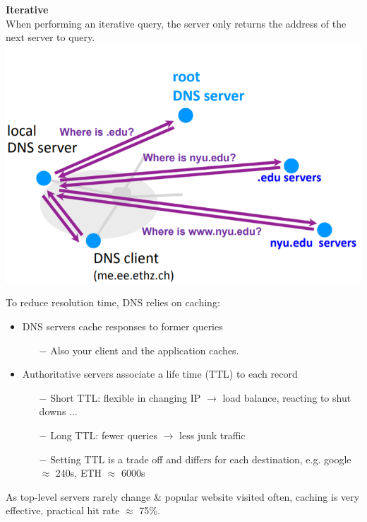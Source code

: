 \documentclass[a4paper, fontsize=8pt, landscape, DIV=1]{scrartcl}
\begin{document}
\begin{multicols*}{4}
		\textbf{Iterative}\\
		When performing an iterative query, the server only returns the address of the next server to query.\\
		\includegraphics[width=\columnwidth]{images/Application_Layer/dns_iterative.png}
		\par 
		
		To reduce resolution time, DNS relies on caching:
		\begin{itemize}[noitemsep]
			\item DNS servers cache responses to former queries
			\begin{itemize}
				\item[$-$] Also your client and the application caches.
			\end{itemize}
			\item Authoritative servers associate a life time (TTL) to each record
			\begin{itemize}
				\item[$-$] Short TTL: flexible in changing IP $\rightarrow$ load balance, reacting to shut downs ...
				\item[$-$] Long TTL: fewer queries $\rightarrow$ less junk traffic
				\item[$-$] Setting TTL is a trade off and differs for each destination, e.g. google $\approx$ 240s, ETH $\approx$ 6000s
			\end{itemize}
		\end{itemize}
		As top-level servers rarely change \& popular website visited often, caching is very effective, practical hit rate $\approx$ 75\%.
		

\end{multicols*}
\end{document}
